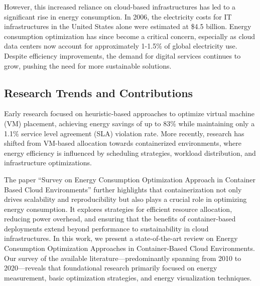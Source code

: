 \documentclass[runningheads]{llncs}
\begin{document}
However, this increased reliance on cloud-based infrastructures has led to a significant rise in energy 
consumption. In 2006, the electricity costs for IT infrastructures in the United States alone were 
estimated at \$4.5 billion\cite{beloglazov_energy_2010}. Energy consumption optimization has since become a 
critical concern, especially as cloud data centers now account for approximately 1-1.5\% of global 
electricity use\cite{IEADataCentres}. Despite efficiency improvements, the demand for digital 
services continues to grow, pushing the need for more sustainable solutions.

\subsection{Research Trends and Contributions}
Early research focused on heuristic-based approaches to optimize virtual machine (VM) placement, achieving 
energy savings of up to 83\% while maintaining only a 1.1\% service level agreement (SLA) violation 
rate\cite{beloglazov_energy_2010}. More recently, research has shifted from VM-based allocation towards 
containerized environments, where energy efficiency is influenced by scheduling strategies, workload 
distribution, and infrastructure optimizations. 

The paper ``Survey on Energy Consumption Optimization Approach in Container Based Cloud Environments'' 
further highlights that containerization not only drives scalability and 
reproducibility but also plays a crucial role in optimizing energy consumption. It 
explores strategies for efficient resource allocation, reducing power overhead, and 
ensuring that the benefits of container-based deployments extend beyond performance 
to sustainability in cloud infrastructures.
In this work, we present a state-of-the-art review on Energy Consumption Optimization Approaches in 
Container-Based Cloud Environments. Our survey of the available literature—predominantly spanning 
from 2010 to 2020—reveals that foundational research primarily focused on energy measurement, 
basic optimization strategies, and energy visualization techniques\cite{beloglazov_energy_2010}.
\end{document}
